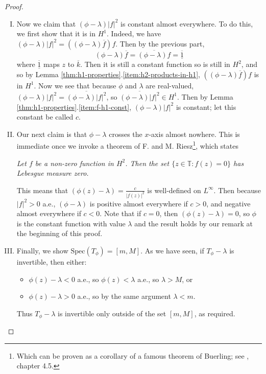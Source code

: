 \documentclass{article}
\newcommand{\Spec}{\text{Spec}}
\newcommand{\1}{\mathbf{1}}
\begin{document}
\begin{proof}
\begin{enumerate}[I.]
\item Now we claim that $(\phi - \lambda)|f|^2$ is constant almost everywhere. To do this, we first show that it is in $H^1$. Indeed, we have
$(\phi - \lambda)|f|^2 = ((\phi - \lambda)\overline{f}) f$. Then by the previous part, $$(\phi - \lambda)\overline{f} = \overline{(\phi - \lambda)f} = \overline{\underline{1}}$$
where $\overline{\underline{1}}$ maps $z$ to $\overline{k}$. Then it is still a constant function so is still in $H^2$, and so by Lemma \ref{thm:h1-properties}.\ref{item:h2-products-in-h1}, $((\phi - \lambda)\overline{f}) f$ is in $H^1$. Now we see that because $\phi$ and $\lambda$ are real-valued, $(\phi - \lambda)|f|^2 = \overline{(\phi - \lambda)|f|^2}$, so $\overline{(\phi - \lambda)|f|^2} \in H^1$. Then by Lemma \ref{thm:h1-properties}.\ref{item:f-h1-const}, $(\phi - \lambda)|f|^2$ is constant; let this constant be called $c$.
\item Our next claim is that $\phi - \lambda$ crosses the $x$-axis almost nowhere. This is immediate once we invoke a theorem of F. and M. Riesz\footnote{Which can be proven as a corollary of a famous theorem of Buerling; see \parencite{arveson2002short}, chapter 4.5.}, which states
\begin{displayquote}
\emph{Let $f$ be a non-zero function in $H^2$. Then the set $\{z \in \mathbb{T} : f(z) = 0\}$ has Lebesgue measure zero.}
\end{displayquote}
This means that $(\phi(z) - \lambda) = \frac{c}{|f(z)|^2}$ is well-defined on $L^\infty$. Then because $|f|^2 > 0$ a.e., $(\phi - \lambda)$ is positive almost everywhere if $c > 0$, and negative almost everywhere if $c < 0$. Note that if $c = 0$, then $(\phi(z) - \lambda) = 0$, so $\phi$ is the 
constant function with value $\lambda$ and the result holds by our remark at the beginning of this proof.
\item Finally, we show $\Spec(T_\phi) = [m, M]$. As we have seen, if $T_\phi - \lambda$ is invertible, then either:
\begin{itemize}
\item $\phi(z) - \lambda < 0$ a.e., so $\phi(z) < \lambda$ a.e., so $\lambda > M$, or
\item $\phi(z) - \lambda > 0$ a.e., so by the same argument $\lambda < m$.
\end{itemize}
Thus $T_\phi - \lambda$ is invertible only outside of the set $[m, M]$, as required.
\end{enumerate}
\end{proof}
\end{document}
